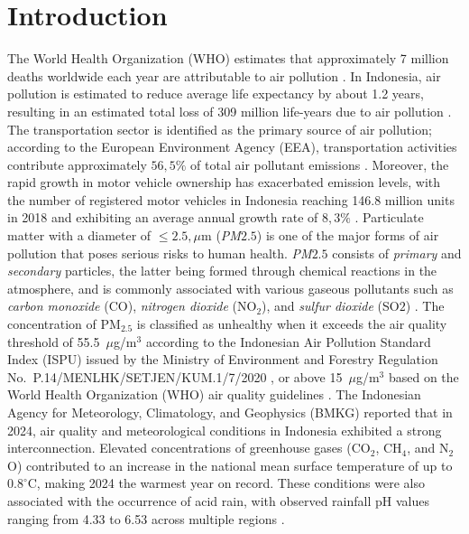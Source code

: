 \documentclass[review,12pt]{elsarticle}
\begin{document}


\section{Introduction}
\label{sec1}
The World Health Organization (WHO) estimates that approximately 7 million deaths worldwide each year are attributable to air pollution \cite{WHO2024}. In Indonesia, air pollution is estimated to reduce average life expectancy by about 1.2 years, resulting in an estimated total loss of 309 million life-years due to air pollution \cite{Madrigano2024}. The transportation sector is identified as the primary source of air pollution; according to the European Environment Agency (EEA), transportation activities contribute approximately $56{,}5\%$ of total air pollutant emissions \cite{EEA2022Transport}. Moreover, the rapid growth in motor vehicle ownership has exacerbated emission levels, with the number of registered motor vehicles in Indonesia reaching 146.8 million units in 2018 and exhibiting an average annual growth rate of $8{,}3\%$ \cite{Dimension2022}.
	Particulate matter with a diameter of $\leq 2.5,\mu\text{m}$ (\textit{PM}${2.5}$) is one of the major forms of air pollution that poses serious risks to human health. \textit{PM}${2.5}$ consists of {\itshape primary} and {\itshape secondary} particles, the latter being formed through chemical reactions in the atmosphere, and is commonly associated with various gaseous pollutants such as {\itshape carbon monoxide} (CO), {\itshape nitrogen dioxide} (NO$_2$), and {\itshape sulfur dioxide} (SO$2$) \cite{Shu2024} . The concentration of PM$_{2.5}$ is classified as unhealthy when it exceeds the air quality threshold of 55.5~$\mu$g/m$^{3}$ according to the Indonesian Air Pollution Standard Index (ISPU) issued by the Ministry of Environment and Forestry Regulation No.~P.14/MENLHK/SETJEN/KUM.1/7/2020 \cite{KLHK2020}, or above 15~$\mu$g/m$^3$ based on the World Health Organization (WHO) air quality guidelines \cite{WHO2021}.
	The Indonesian Agency for Meteorology, Climatology, and Geophysics (BMKG) reported that in 2024, air quality and meteorological conditions in Indonesia exhibited a strong interconnection. Elevated concentrations of greenhouse gases (CO$_2$, CH$_4$, and N$_2$O) contributed to an increase in the national mean surface temperature of up to $0.8^{\circ}\mathrm{C}$, making 2024 the warmest year on record. These conditions were also associated with the occurrence of acid rain, with observed rainfall pH values ranging from 4.33 to 6.53 across multiple regions \cite{BMKG2024}.
\end{document}
